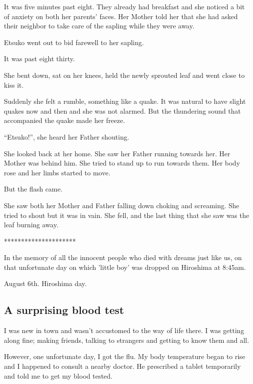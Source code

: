 \documentclass[twoside,11pt]{article}
\begin{document}
It was five minutes past eight. They already had breakfast and she noticed a bit of anxiety on both her parents' faces. Her Mother told her that she had asked their neighbor to take care of the sapling while they were away.

 Etsuko went out to bid farewell to her sapling.

 It was past eight thirty.

 She bent down, sat on her knees, held the newly sprouted leaf and went close to kiss it.

Suddenly she felt a rumble, something like a quake. It was natural to have slight quakes now and then and she was not alarmed. But the thundering sound that accompanied the quake made her freeze.

``Etsuko!'', she heard her Father shouting.

She looked back at her home. She saw her Father running towards her. Her Mother was behind him. She tried to stand up to run towards them. Her body rose and her limbs started to move.

But the flash came.

She saw both her Mother and Father falling down choking and screaming. She tried to shout but it was in vain. She fell, and the last thing that she saw was the leaf burning away.

\bigskip
\begin{center}
*********************
\end{center}

 In the memory of all the innocent people who died with dreams just like us, on that unfortunate day on which 'little boy' was dropped on Hiroshima at 8:45am.

 August 6th. Hiroshima day.
\newpage

\begin{center}
  \section{A surprising blood test}
\end{center}
\bigskip
\bigskip
\bigskip

I was new in town and wasn't accustomed to the way of life there. I was getting along fine; making friends, talking to strangers and getting to know them and all.

However, one unfortunate day, I got the flu. My body temperature began to rise and I happened to consult a nearby doctor. He prescribed a tablet temporarily and told me to get my blood tested.
\end{document}

